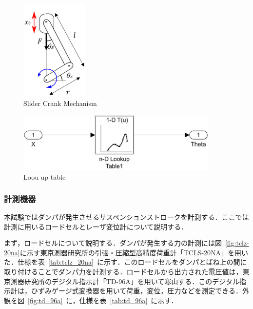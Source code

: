 \documentclass[a4paper,12pt]{article_vdlab_sotsuron}
\begin{document}
\vspace*{5mm}
\begin{figure}[htp]
  \begin{center}
    \includegraphics[height=50mm]{figure/slider_crank.eps}
    \vspace*{3mm}
    \caption{Slider Crank Mechanism}
    \label{fig:slider_crank}
  \end{center}
\end{figure}
\vspace*{5mm}
\begin{figure}[htp]
  \begin{center}
    \includegraphics[height=30mm]{figure/Lookuptable.eps}
    \vspace*{3mm}
    \caption{Loou up table}
    \label{fig:Look}
  \end{center}
\end{figure}

\newpage
\subsubsection{計測機器}
本試験ではダンパが発生させるサスペンションストロークを計測する．ここでは計測に用いるロードセルとレーザ変位計について説明する．

まず，ロードセルについて説明する．ダンパが発生する力の計測には図~\ref{fig:tclz-20na}に示す東京測器研究所の引張・圧縮型高精度荷重計「TCLS-20NA」を用いた．仕様を表~\ref{tab:tclz_20na}~に示す．このロードセルをダンパとばね上の間に取り付けることでダンパ力を計測する．ロードセルから出力された電圧値は，東京測器研究所のデジタル指示計「TD-96A」を用いて寒山する．このデジタル指示計は，ひずみゲージ式変換器を用いて荷重，変位，圧力などを測定できる．外観を図~\ref{fig:td_96a}~に，仕様を表~\ref{tab:td_96a}~に示す．
\end{document}
